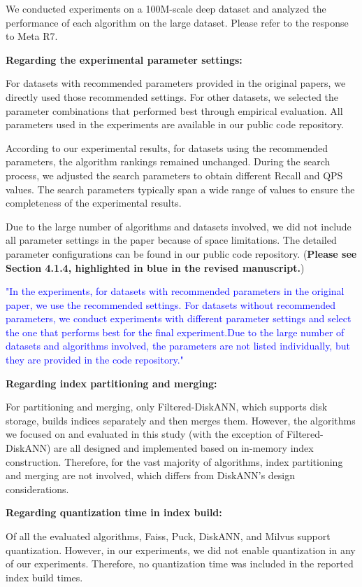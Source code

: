 \documentclass[sigconf, nonacm]{acmart}
\newcounter{detailed}[section]
\begin{document}
We conducted experiments on a 100M-scale deep dataset and analyzed the performance of each algorithm on the large dataset. Please refer to the response to Meta R7.

\textbf{Regarding the experimental parameter settings:}

For datasets with recommended parameters provided in the original papers, we directly used those recommended settings. For other datasets, we selected the parameter combinations that performed best through empirical evaluation. All parameters used in the experiments are available in our public code repository.

According to our experimental results, for datasets using the recommended parameters, the algorithm rankings remained unchanged. During the search process, we adjusted the search parameters to obtain different Recall and QPS values. The search parameters typically span a wide range of values to ensure the completeness of the experimental results.

Due to the large number of algorithms and datasets involved, we did not include all parameter settings in the paper because of space limitations. The detailed parameter configurations can be found in our public code repository. (\textbf{Please see Section 4.1.4, highlighted in blue in the revised manuscript.})

	\textcolor{blue}{
"In the experiments, for datasets with recommended parameters in the original paper, we use the recommended settings. For datasets without recommended parameters, we conduct experiments with different parameter settings and select the one that performs best for the final experiment.Due to the large number of datasets and algorithms involved, the parameters are not listed individually, but they are provided in the code repository."}
 
\textbf{Regarding index partitioning and merging:}

For partitioning and merging, only Filtered-DiskANN, which supports disk storage, builds indices separately and then merges them. However, the algorithms we focused on and evaluated in this study (with the exception of Filtered-DiskANN) are all designed and implemented based on in-memory index construction. Therefore, for the vast majority of algorithms, index partitioning and merging are not involved, which differs from DiskANN's design considerations.

\textbf{Regarding quantization time in index build:}

Of all the evaluated algorithms, Faiss, Puck, DiskANN, and Milvus support quantization. However, in our experiments, we did not enable quantization in any of our experiments. Therefore, no quantization time was included in the reported index build times.
\end{document}
